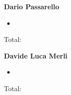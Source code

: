 \textbf{Dario Passarello}
\begin{itemize}
    \item
\end{itemize}

Total: 

\bigskip

\textbf{Davide Luca Merli}

\begin{itemize}
    \item
\end{itemize}

Total: 
